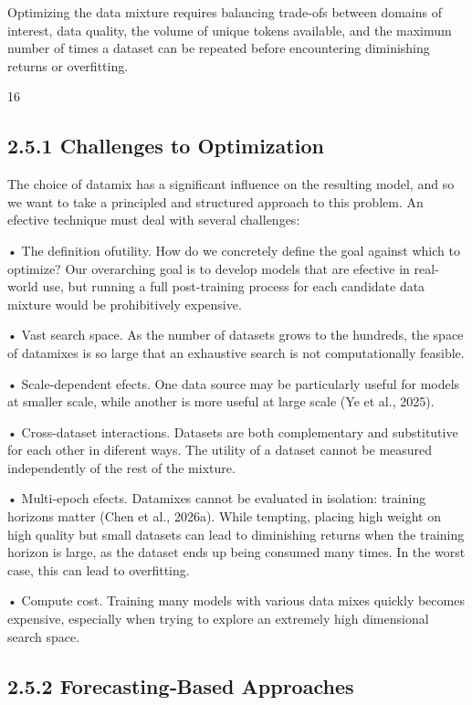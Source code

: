 \documentclass[
  10
]{article}
\begin{document}
Optimizing the data mixture requires balancing trade-ofs between domains
of interest, data quality, the volume of unique tokens available, and
the maximum number of times a dataset can be repeated before
encountering diminishing returns or overfitting.

16

\subsection{2.5.1 Challenges to
Optimization}\label{challenges-to-optimization}

The choice of datamix has a significant influence on the resulting
model, and so we want to take a principled and structured approach to
this problem. An efective technique must deal with several challenges:

• The definition ofutility. How do we concretely define the goal against
which to optimize? Our overarching goal is to develop models that are
efective in real-world use, but running a full post-training process for
each candidate data mixture would be prohibitively expensive.

• Vast search space. As the number of datasets grows to the hundreds,
the space of datamixes is so large that an exhaustive search is not
computationally feasible.

• Scale-dependent efects. One data source may be particularly useful for
models at smaller scale, while another is more useful at large scale (Ye
et al., 2025).

• Cross-dataset interactions. Datasets are both complementary and
substitutive for each other in diferent ways. The utility of a dataset
cannot be measured independently of the rest of the mixture.

• Multi-epoch efects. Datamixes cannot be evaluated in isolation:
training horizons matter (Chen et al., 2026a). While tempting, placing
high weight on high quality but small datasets can lead to diminishing
returns when the training horizon is large, as the dataset ends up being
consumed many times. In the worst case, this can lead to overfitting.

• Compute cost. Training many models with various data mixes quickly
becomes expensive, especially when trying to explore an extremely high
dimensional search space.

\subsection{2.5.2 Forecasting‐Based
Approaches}\label{forecastingbased-approaches}
\end{document}

